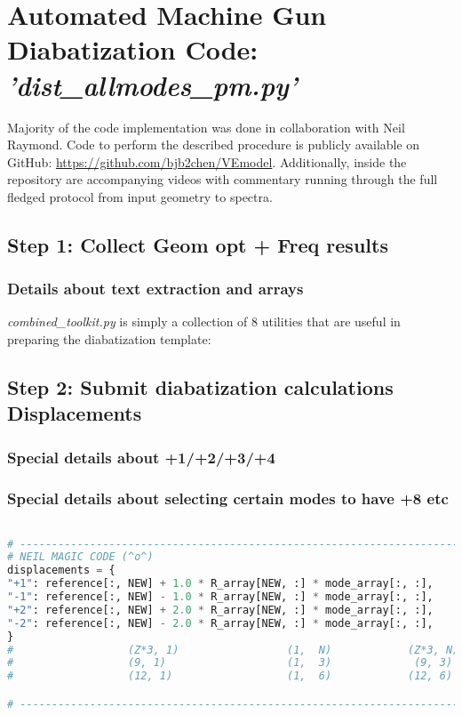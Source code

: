 \section{Automated Machine Gun Diabatization Code: \\ \textit{'dist\_allmodes\_pm.py'}\label{sec:s1}}
Majority of the code implementation was done in collaboration with Neil Raymond. Code to perform the described procedure is publicly available on GitHub: \url{https://github.com/bjb2chen/VEmodel}. Additionally, inside the repository are accompanying videos with commentary running through the full fledged protocol from input geometry to spectra. 

\subsection{Step 1: Collect Geom opt + Freq results\label{dstep1}}
\subsubsection{Details about text extraction and arrays}


\textit{combined\_toolkit.py} is simply a collection of 8 utilities that are useful in preparing the diabatization template:

\subsection{Step 2: Submit diabatization calculations Displacements\label{dstep1}}

\subsubsection{Special details about +1/+2/+3/+4}
\subsubsection{Special details about selecting certain modes to have +8 etc}



\begin{lstlisting}[language=Python, caption=Precomputing linear displacements]

# -----------------------------------------------------------------------
# NEIL MAGIC CODE (^o^)
displacements = {
"+1": reference[:, NEW] + 1.0 * R_array[NEW, :] * mode_array[:, :],
"-1": reference[:, NEW] - 1.0 * R_array[NEW, :] * mode_array[:, :],
"+2": reference[:, NEW] + 2.0 * R_array[NEW, :] * mode_array[:, :],
"-2": reference[:, NEW] - 2.0 * R_array[NEW, :] * mode_array[:, :],
}
#                  (Z*3, 1)                 (1,  N)            (Z*3, N)
#                  (9, 1)                   (1,  3)             (9, 3)
#                  (12, 1)                  (1,  6)            (12, 6)

# -----------------------------------------------------------------------
\end{lstlisting}

